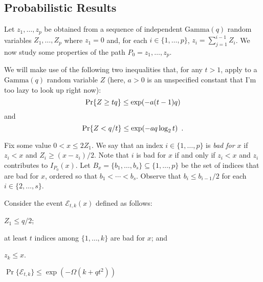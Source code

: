 \documentclass{patmorin}
\begin{document}
\subsection{Probabilistic Results}

Let $z_1,\ldots,z_p$ be obtained from a sequence of independent $\mathrm{Gamma}(q)$ random variables $Z_1,\ldots,Z_p$ where $z_1=0$ and, for each $i\in\{1,\ldots,p\}$, $z_i=\sum_{j=1}^{i-1}Z_i$.  We now study some properties of the path $P_0=z_1,\ldots,z_p$.

We will make use of the following two inequalities that, for any $t>1$, apply to a $\mathrm{Gamma}(q)$ random variable $Z$ (here, $a>0$ is an unspecified constant that I'm too lazy to look up right now):
\begin{equation}
  \Pr\{Z \ge tq\} \le \exp(-a(t-1)q) \eqlabel{gamma-tail-bound}
\end{equation}
and 
\begin{equation}
  \Pr\{Z < q/t\} \le \exp(-aq\log_2 t) \enspace . \eqlabel{gamma-head-bound}
\end{equation}

Fix some value $0< x \le 2Z_1$.  
We say that an index $i\in\{1,\ldots,p\}$ is \emph{bad for $x$} if $z_i < x$ and $Z_i \ge (x-z_i)/2$.  Note that $i$ is bad for $x$ if and only if $z_i<x$ and $z_i$ contributes to $I_{P_0}(x)$.  Let $B_x=\{b_1,\ldots,b_s\}\subseteq\{1,\ldots,p\}$ be the set of indices that are bad for $x$, ordered so that $b_1<\cdots < b_s$.  Observe that $b_i \le b_{i-1}/2$ for each $i\in\{2,\ldots,s\}$.

Consider the event $\mathcal{E}_{t,k}(x)$ defined as follows:
\begin{compactenum}
  \item $Z_1 \le q/2$;
  \item at least $t$ indices among $\{1,\ldots,k\}$ are bad for $x$; and
  \item $z_k \le x$.
\end{compactenum}

\begin{lem}
  $\Pr\{\mathcal{E}_{t,k}\} \le \exp(-\Omega(k+qt^2))$
\end{lem}
\end{document}

